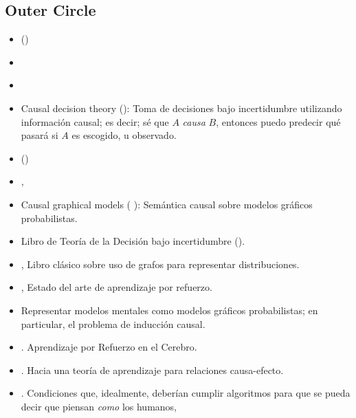\documentclass[11pt]{article}
\theoremstyle{plain}
\begin{document}
\subsection{Outer Circle}
\begin{itemize}
\item (\cite{suppes1970probabilistic})
\item \cite{holland1986statistics}
\item \cite{sutton1998reinforcement}
\item Causal decision theory (\cite{joyce1999foundations}): Toma de decisiones bajo incertidumbre utilizando información causal; es decir; sé que $A$ \textit{causa} $B$, entonces puedo predecir qué pasará si $A$ es escogido, u observado.
\item (\cite{spirtes2000causation})
\item \cite{pearl2009causality},
\item Causal graphical models ( \cite{koller2009probabilistic}): Semántica causal sobre modelos gráficos probabilistas.
\item Libro de Teoría de la Decisión bajo incertidumbre (\cite{gilboa2009decision}).
\item \cite{pearl1988probabilistic}, Libro clásico sobre uso de grafos para representar distribuciones.
\item \cite{van2012reinforcement}, Estado del arte de aprendizaje por refuerzo.
\item  \cite{danks2014unifying} Representar modelos mentales como modelos gráficos probabilistas; en particular, el problema de inducción causal. 
\item \cite{gershman2015reinforcement}. Aprendizaje por Refuerzo en el Cerebro.
\item \cite{lopez2015towards}. Hacia una teoría de aprendizaje para relaciones causa-efecto.
\item \cite{lake2017building}. Condiciones que, idealmente, deberían cumplir algoritmos para que se pueda decir que piensan \textit{como} los humanos,
\end{itemize}
\end{document}

